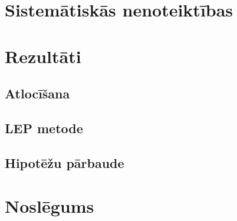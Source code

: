 \documentclass[titlepage, a4paper, LV, SHORT]{mythesis}
\begin{document}
\chapter{Sistemātiskās nenoteiktības}
\label{chap:systematic_uncertainties}



\chapter{Rezultāti}
\label{chap:results}


\section{Atlocīšana}


\section{LEP metode}


\section{Hipotēžu pārbaude}


\chapter{Noslēgums}


\clearpage
\printbibliography[heading=bibintoc]
\end{document}
